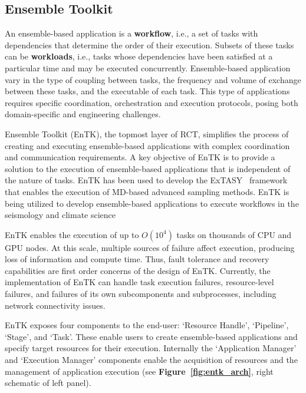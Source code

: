 \subsection{Ensemble Toolkit}

An ensemble-based application is a \textbf{workflow}, i.e., a set of tasks
with dependencies that determine the order of their execution. Subsets of
these tasks can be \textbf{workloads}, i.e., tasks whose dependencies have
been satisfied at a particular time and may be executed concurrently.
Ensemble-based application vary in the type of coupling between tasks, the
frequency and volume of exchange between these tasks, and the executable of
each task. This type of applications requires specific coordination,
orchestration and execution protocols, posing both domain-specific and
engineering challenges.

Ensemble Toolkit (EnTK), the topmost layer of RCT, simplifies the process of
creating and executing ensemble-based applications with complex coordination
and communication requirements. A key objective of EnTK is to provide a
solution to the execution of ensemble-based applications that is independent
of the nature of tasks. EnTK has been used to develop the
ExTASY~\cite{extasy-2016} framework that enables the execution of MD-based
advanced sampling methods. EnTK is being utilized to develop ensemble-based
applications to execute workflows in the seismology and climate science

EnTK enables the execution of up to $O(10^4)$ tasks on thousands of CPU and
GPU nodes. At this scale, multiple sources of failure affect execution,
producing loss of information and compute time. Thus, fault tolerance and
recovery capabilities are first order concerns of the design of EnTK\@.
Currently, the implementation of EnTK can handle task execution failures,
resource-level failures, and failures of its own subcomponents and
subprocesses, including network connectivity issues.

EnTK exposes four components to the end-user: `Resource Handle', `Pipeline',
`Stage', and `Task'. These enable users to create ensemble-based applications
and specify target resources for their execution. Internally the `Application
Manager' and `Execution Manager' components enable the acquisition of
resources and the management of application execution (see
\textbf{Figure~\ref{fig:entk_arch}}, right schematic of left panel).


